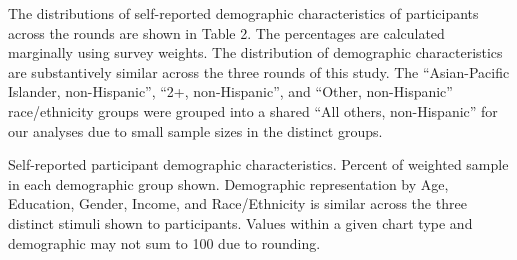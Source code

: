 \documentclass{IEEEcsmag}
\begin{document}
The distributions of self-reported demographic characteristics of participants across the rounds are shown in Table 2. The percentages are calculated marginally using survey weights. The distribution of demographic characteristics are substantively similar across the three rounds of this study. The ``Asian-Pacific Islander, non-Hispanic'', ``2+, non-Hispanic'', and ``Other, non-Hispanic'' race/ethnicity groups were grouped into a shared ``All others, non-Hispanic'' for our analyses due to small sample sizes in the distinct groups.

\begin{table}
\label{demographicstable}
\caption{Self-reported participant demographic characteristics. Percent of weighted sample in each demographic group shown. Demographic representation by Age, Education, Gender, Income, and Race/Ethnicity is similar across the three distinct stimuli shown to participants. Values within a given chart type and demographic may not sum to 100 due to rounding.}


\end{table}
\end{document}
